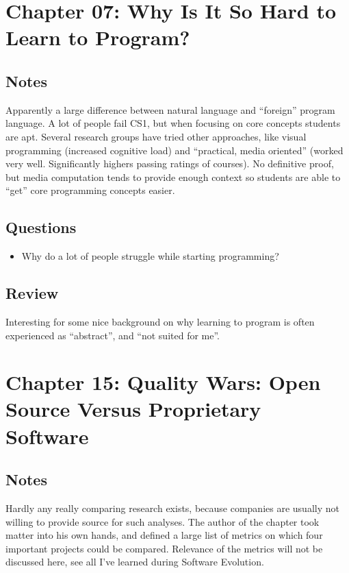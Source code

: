 \section{Chapter 07: Why Is It So Hard to Learn to Program?}
\subsection{Notes}
Apparently a large difference between natural language and ``foreign'' program language. 
A lot of people fail CS1, but when focusing on core concepts students are apt. 
Several research groups have tried other approaches, like visual programming (increased cognitive load) and ``practical, media oriented'' (worked very well. Significantly highers passing ratings of courses).
No definitive proof, but media computation tends to provide enough context so students are able to ``get'' core programming concepts easier. 

\subsection{Questions}
\begin{itemize}
  \item Why do a lot of people struggle while starting programming?
\end{itemize}

\subsection{Review}
Interesting for some nice background on why learning to program is often experienced as ``abstract'', and ``not suited for me''. 

\section{Chapter 15: Quality Wars: Open Source Versus Proprietary Software}
\subsection{Notes}
Hardly any really comparing research exists, because companies are usually not willing to provide source for such analyses.
The author of the chapter took matter into his own hands, and defined a large list of metrics on which four important projects could be compared. 
Relevance of the metrics will not be discussed here, see all I've learned during Software Evolution. 

